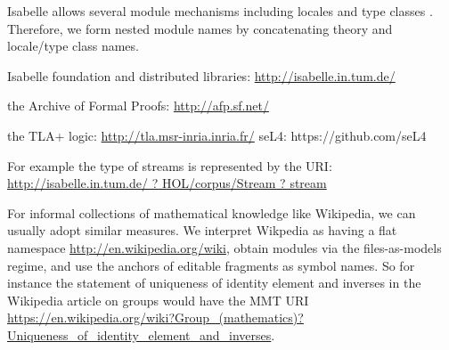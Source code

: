 Isabelle allows several module mechanisms including locales and type classes
\cite{haftmannw-types06}.  Therefore, we form nested module names by concatenating theory
and locale/type class names. %
\begin{compactitem}
 \item Isabelle foundation and distributed libraries: \url{http://isabelle.in.tum.de/}
 \item the Archive of Formal Proofs: \url{http://afp.sf.net/}
 \item the TLA+ logic: \url{http://tla.msr-inria.inria.fr/}
 seL4: https://github.com/seL4
\end{compactitem}

For example the type of streams is represented by the URI:\\
\url{http://isabelle.in.tum.de/ ? HOL/corpus/Stream ? stream}


For informal collections of mathematical knowledge like Wikipedia, we can usually adopt
similar measures. We interpret Wikpedia as having a flat namespace
\url{http://en.wikipedia.org/wiki}, obtain modules via the files-as-models regime, and use
the anchors of editable fragments as symbol names. So for instance the statement of
uniqueness of identity element and inverses in the Wikipedia article on groups would have
the MMT URI
\url{https://en.wikipedia.org/wiki?Group_(mathematics)?Uniqueness_of_identity_element_and_inverses}.



